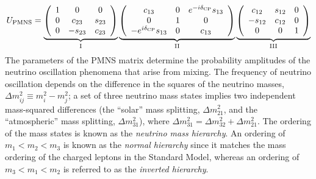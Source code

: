 \begin{equation}
U_{\rm PMNS} = 
  \underbrace{
    \left( \begin{array}{ccc}
        1 & 0 & 0 \\ 
        0 & c_{23} & s_{23} \\ 
        0 & -s_{23} & c_{23}
    \end{array} \right)
  }_{\rm I}
\underbrace{
  \left( \begin{array}{ccc}
      c_{13} & 0 & e^{-i\mdeltacp}s_{13} \\ 
      0 & 1 & 0 \\ 
      -e^{i\mdeltacp}s_{13} & 0 & c_{13}
  \end{array} \right) 
}_{\rm II}
\underbrace{
 \left( \begin{array}{ccc}
      c_{12} & s_{12} & 0 \\ 
      -s_{12} & c_{12} & 0 \\ 
      0 & 0 & 1
  \end{array} \right) 
}_{\rm III}
\label{eqn:pmns}
\end{equation}
The parameters of the PMNS
matrix determine the probability amplitudes of the neutrino
oscillation phenomena that arise from mixing.  The frequency of neutrino oscillation 
depends on the difference in the squares of the neutrino
masses, $\Delta m^{2}_{ij} \equiv m^{2}_{i} - m^{2}_{j}$; a set of three
neutrino mass states implies two independent mass-squared differences
(the ``solar'' mass splitting, $\Delta m^{2}_{21}$, and the ``atmospheric'' mass splitting, 
$\Delta m^{2}_{31}$), where $\Delta m^{2}_{31} = \Delta m^{2}_{32} + \Delta m^{2}_{21}$. The ordering of the
mass states is known as the \emph{neutrino mass hierarchy}. An ordering of
$m_1 < m_2 < m_3$ is known as the \emph{normal hierarchy} since it matches
the mass ordering of the charged leptons in the Standard Model, whereas an ordering of $m_3 < m_1 < m_2$
is referred to as the \emph{inverted hierarchy}.

